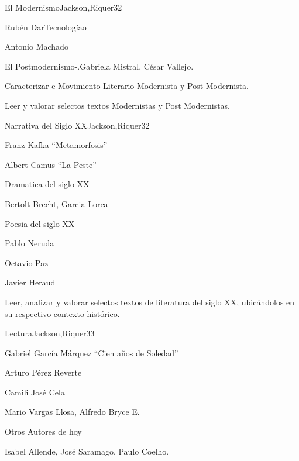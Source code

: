 \begin{syllabus}
\begin{unit}{El Modernismo}{Jackson,Riquer}{3}{2}
\begin{topics}
	\item Rubén DarTecnologíao
	\item Antonio Machado
	\item El Postmodernismo-.Gabriela Mistral, César Vallejo.
\end{topics}
\begin{unitgoals}
	\item Caracterizar e Movimiento Literario Modernista y Post-Modernista.
	\item Leer y valorar selectos textos Modernistas y Post Modernistas.
\end{unitgoals}
\end{unit}

\begin{unit}{Narrativa del Siglo XX}{Jackson,Riquer}{3}{2}
\begin{topics}
	\item Franz Kafka ``Metamorfosis''
	\item Albert Camus ``La Peste''
	\item Dramatica del siglo XX
	\item Bertolt Brecht, Garcia Lorca
	\item Poesia del siglo XX
	\item Pablo Neruda
	\item Octavio Paz
	\item Javier Heraud
\end{topics}
\begin{unitgoals}
	\item Leer, analizar y valorar selectos textos de literatura del siglo XX, ubicándolos en su respectivo contexto histórico.
\end{unitgoals}
\end{unit}

\begin{unit}{Lectura}{Jackson,Riquer}{3}{3}
\begin{topics}
	\item Gabriel García Márquez ``Cien años de Soledad''
	\item Arturo Pérez Reverte
	\item Camili José Cela
	\item Mario Vargas Llosa, Alfredo Bryce E.
	\item Otros Autores de hoy
	\item Isabel Allende, José Saramago, Paulo Coelho.
\end{topics}
\end{unit}



\begin{coursebibliography}
\end{coursebibliography}
\end{syllabus}
